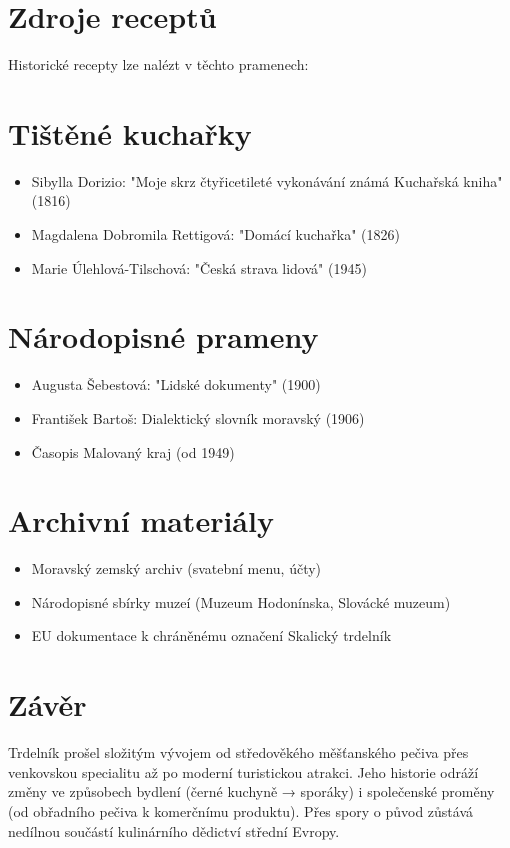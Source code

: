 \documentclass[a5paper,10pt]{book}
\begin{document}
\section{Zdroje receptů}
Historické recepty lze nalézt v těchto pramenech:

\section{Tištěné kuchařky}
\begin{itemize}
  \item Sibylla Dorizio: "Moje skrz čtyřicetileté vykonávání známá Kuchařská kniha" (1816)
  \item Magdalena Dobromila Rettigová: "Domácí kuchařka" (1826)
  \item Marie Úlehlová-Tilschová: "Česká strava lidová" (1945)
\end{itemize}

\section{Národopisné prameny}
\begin{itemize}
  \item Augusta Šebestová: "Lidské dokumenty" (1900)
  \item František Bartoš: Dialektický slovník moravský (1906)
  \item Časopis Malovaný kraj (od 1949)
\end{itemize}

\section{Archivní materiály}
\begin{itemize}
  \item Moravský zemský archiv (svatební menu, účty)
  \item Národopisné sbírky muzeí (Muzeum Hodonínska, Slovácké muzeum)
  \item EU dokumentace k chráněnému označení Skalický trdelník
\end{itemize}

\section{Závěr}
Trdelník prošel složitým vývojem od středověkého měšťanského pečiva přes venkovskou specialitu až po moderní turistickou atrakci. Jeho historie odráží změny ve způsobech bydlení (černé kuchyně → sporáky) i společenské proměny (od obřadního pečiva k komerčnímu produktu). Přes spory o původ zůstává nedílnou součástí kulinárního dědictví střední Evropy.

  
\end{document}
